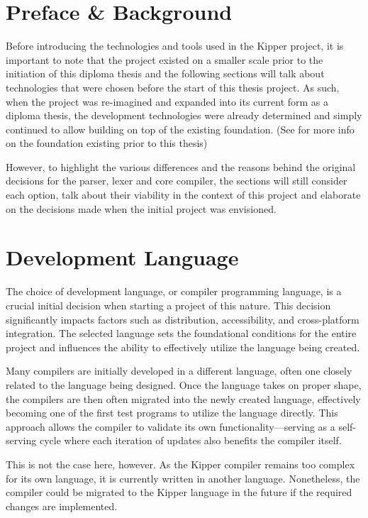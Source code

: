 \section{Preface \& Background}
\label{sec:technology-preface-and-background}

Before introducing the technologies and tools used in the Kipper project, it is important to note that the project existed on a smaller scale prior to the initiation of this diploma thesis and the following sections will talk about technologies that were chosen before the start of this thesis project. As such, when the project was re-imagined and expanded into its current form as a diploma thesis, the development technologies were already determined and simply continued to allow building on top of the existing foundation. (See  for more info on the foundation existing prior to this thesis)

However, to highlight the various differences and the reasons behind the original decisions for the parser, lexer and core compiler, the sections will still consider each option, talk about their viability in the context of this project and elaborate on the decisions made when the initial project was envisioned.

\section{Development Language}
\label{sec:development-language}

The choice of development language, or compiler programming language, is a crucial initial decision when starting a project of this nature. This decision significantly impacts factors such as distribution, accessibility, and cross-platform integration. The selected language sets the foundational conditions for the entire project and influences the ability to effectively utilize the language being created.

Many compilers are initially developed in a different language, often one closely related to the language being designed. Once the language takes on proper shape, the compilers are then often migrated into the newly created language, effectively becoming one of the first test programs to utilize the language directly. This approach allows the compiler to validate its own functionality—serving as a self-serving cycle where each iteration of updates also benefits the compiler itself.

This is not the case here, however. As the Kipper compiler remains too complex for its own language, it is currently written in another language. Nonetheless, the compiler could be migrated to the Kipper language in the future if the required changes are implemented.

